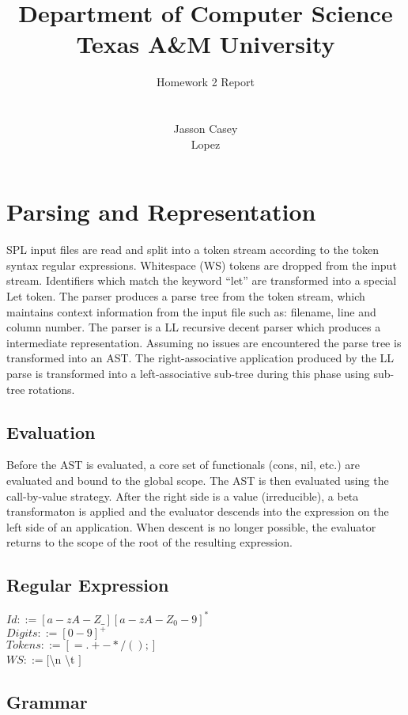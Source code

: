 \documentclass{article}
\title{
Department of Computer Science \\Texas A\&M University}
\author{\LARGE Homework 2 Report\\ \\
\\Jasson Casey
\\\Michael Lopez }
\begin{document}
\maketitle

\section{Parsing and Representation}

SPL input files are read and split into a token stream according to the token
syntax regular expressions. Whitespace (WS) tokens are dropped from the input
stream. Identifiers which match the keyword ``let'' are transformed into a 
special Let token. The parser produces a parse tree from the token stream,
which maintains context information from the input file such as: filename, line
and column number. The parser is a LL recursive decent parser which produces a 
intermediate representation. Assuming no issues are encountered the parse
tree is transformed into an AST. The right-associative application produced by
the LL parse is transformed into a left-associative sub-tree during this phase
using sub-tree rotations.

\subsection{Evaluation}
Before the AST is evaluated, a core set of functionals (cons, nil, etc.) are
evaluated and bound to the global scope. The AST is then evaluated using the
call-by-value strategy. After the right side is a value (irreducible),
a beta transformaton is applied and the evaluator descends into the expression
on the left side of an application. When descent is no longer possible, the
evaluator returns to the scope of the root of the resulting expression.

\subsection{Regular Expression}

$Id ::= [a-zA-Z\_][a-zA-Z_0-9]^{*}$\\
$Digits ::= [0-9]^{+}$\\
$Tokens ::= [=.+-*/();]$\\
$WS ::= [$\textbackslash n \textbackslash t $]$

\subsection{Grammar}
\end{document}

